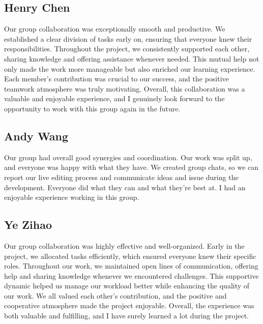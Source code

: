 \documentclass[11pt]{article}
\begin{document}
\subsection{Henry Chen}

Our group collaboration was exceptionally smooth and productive. We established a clear division of tasks early on, ensuring that everyone knew their responsibilities. Throughout the project, we consistently supported each other, sharing knowledge and offering assistance whenever needed. This mutual help not only made the work more manageable but also enriched our learning experience. Each member's contribution was crucial to our success, and the positive teamwork atmosphere was truly motivating. Overall, this collaboration was a valuable and enjoyable experience, and I genuinely look forward to the opportunity to work with this group again in the future.

\subsection{Andy Wang}

Our group had overall good synergies and coordination. Our work was split up, and everyone was happy with what they have. We created group chats, so we can report our live editing process and communicate ideas and issue during the development. Everyone did what they can and what they’re best at. I had an enjoyable experience working in this group.

\subsection{Ye Zihao}

Our group collaboration was highly effective and well-organized. Early in the project, we allocated tasks efficiently, which ensured everyone knew their specific roles. Throughout our work, we maintained open lines of communication, offering help and sharing knowledge whenever we encountered challenges. This supportive dynamic helped us manage our workload better while enhancing the quality of our work. We all valued each other's contribution, and the positive and cooperative atmosphere made the project enjoyable. Overall, the experience was both valuable and fulfilling, and I have surely learned a lot during the project.
\end{document}
